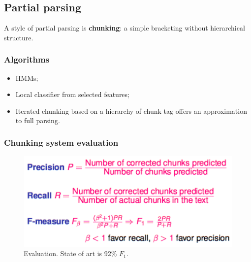 \subsection{Partial parsing}

A style of partial parsing is \textbf{chunking}: a simple bracketing without hierarchical structure. 

\subsubsection{Algorithms}

\begin{itemize}
	\item HMMs;
	\item Local classifier from selected features;
	\item Iterated chunking based on a hierarchy of chunk tag offers an approximation to full parsing.
\end{itemize}

\subsubsection{Chunking system evaluation}

\begin{figure}[htp]
	\centering
	\includegraphics[scale=0.6]{images/57_eval.png}
 	\caption{Evaluation. State of art is 92\% $F_1$.}
\end{figure}